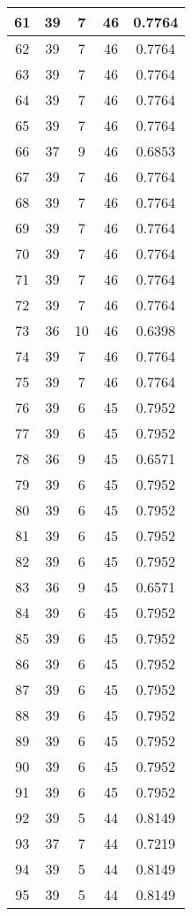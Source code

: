 \documentclass[letterpaper, 12pt]{article}
\begin{document}
\begin{longtable}{|c|c|c|c|c|}
61 & 39 & 7 & 46 & 0.7764 \\
\hline
62 & 39 & 7 & 46 & 0.7764 \\
\hline
63 & 39 & 7 & 46 & 0.7764 \\
\hline
64 & 39 & 7 & 46 & 0.7764 \\
\hline
65 & 39 & 7 & 46 & 0.7764 \\
\hline
66 & 37 & 9 & 46 & 0.6853 \\
\hline
67 & 39 & 7 & 46 & 0.7764 \\
\hline
68 & 39 & 7 & 46 & 0.7764 \\
\hline
69 & 39 & 7 & 46 & 0.7764 \\
\hline
70 & 39 & 7 & 46 & 0.7764 \\
\hline
71 & 39 & 7 & 46 & 0.7764 \\
\hline
72 & 39 & 7 & 46 & 0.7764 \\
\hline
73 & 36 & 10 & 46 & 0.6398 \\
\hline
74 & 39 & 7 & 46 & 0.7764 \\
\hline
75 & 39 & 7 & 46 & 0.7764 \\
\hline
76 & 39 & 6 & 45 & 0.7952 \\
\hline
77 & 39 & 6 & 45 & 0.7952 \\
\hline
78 & 36 & 9 & 45 & 0.6571 \\
\hline
79 & 39 & 6 & 45 & 0.7952 \\
\hline
80 & 39 & 6 & 45 & 0.7952 \\
\hline
81 & 39 & 6 & 45 & 0.7952 \\
\hline
82 & 39 & 6 & 45 & 0.7952 \\
\hline
83 & 36 & 9 & 45 & 0.6571 \\
\hline
84 & 39 & 6 & 45 & 0.7952 \\
\hline
85 & 39 & 6 & 45 & 0.7952 \\
\hline
86 & 39 & 6 & 45 & 0.7952 \\
\hline
87 & 39 & 6 & 45 & 0.7952 \\
\hline
88 & 39 & 6 & 45 & 0.7952 \\
\hline
89 & 39 & 6 & 45 & 0.7952 \\
\hline
90 & 39 & 6 & 45 & 0.7952 \\
\hline
91 & 39 & 6 & 45 & 0.7952 \\
\hline
92 & 39 & 5 & 44 & 0.8149 \\
\hline
93 & 37 & 7 & 44 & 0.7219 \\
\hline
94 & 39 & 5 & 44 & 0.8149 \\
\hline
95 & 39 & 5 & 44 & 0.8149 \\

\end{longtable}
\end{document}

